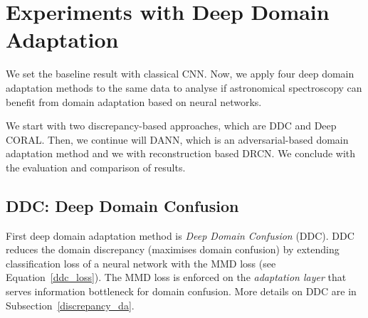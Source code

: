 \begin{table}
\begin{center}
\end{center}
\caption[Confusion matrices of the baseline model]{
	Confusion matrices of the baseline model for the source and target validation sets.
	We see the enormous error on the target domain
	where the model predicts 937 non-QSOs as QSOs and cannot identify 44 QSOs.
}
\end{table}

\section{Experiments with Deep Domain Adaptation}

We set the baseline result with classical CNN.
Now, we apply four deep domain adaptation methods to the same data
to analyse if astronomical spectroscopy can benefit from domain adaptation
based on neural networks.

We start with two discrepancy-based approaches, which are DDC and Deep CORAL.
Then, we continue will DANN, which is an adversarial-based domain adaptation method
and we with reconstruction based DRCN.
We conclude with the evaluation and comparison of results.

\subsection{DDC: Deep Domain Confusion}

First deep domain adaptation method is \textit{Deep Domain Confusion} (DDC).
DDC reduces the domain discrepancy (maximises domain confusion)
by extending classification loss of a neural network with the MMD loss
(see Equation~\ref{ddc_loss}).
The MMD loss is enforced on the \textit{adaptation layer}
that serves information bottleneck for domain confusion.
More details on DDC are in Subsection~\ref{discrepancy_da}.

